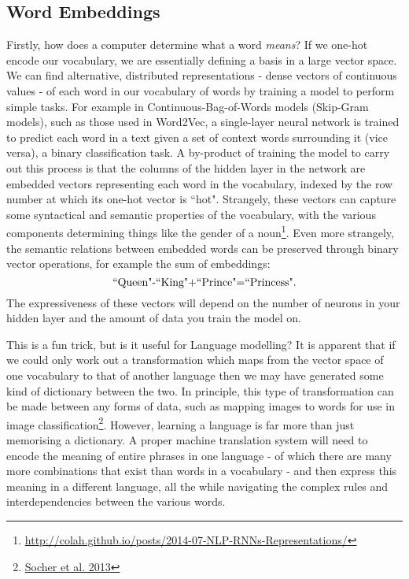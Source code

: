 \documentclass[]{article}
\begin{document}
\subsection{Word Embeddings}
Firstly, how does a computer determine what a word \textit{means}? If we one-hot encode our vocabulary, we are essentially defining a basis in a large vector space. We can find alternative, distributed representations - dense vectors of continuous values - of each word in our vocabulary of words by training a model to perform simple tasks. For example in Continuous-Bag-of-Words models (Skip-Gram models), such as those used in Word2Vec, a single-layer neural network is trained to predict each word in a text given a set of context words surrounding it (vice versa), a binary classification task.  A by-product of training the model to carry out this process is that the columns of the hidden layer in the network are embedded vectors representing each word in the vocabulary, indexed by the row number at which its one-hot vector is ``hot". Strangely, these vectors can capture some syntactical and semantic properties of the vocabulary, with the various components determining things like the gender of a noun\footnote{\url{http://colah.github.io/posts/2014-07-NLP-RNNs-Representations/}}. Even more strangely, the semantic relations between embedded words can be preserved through binary vector operations, for example the sum of embeddings: \begin{equation}\textnormal{``Queen"-``King"+``Prince"=``Princess".}
\end{equation}
The expressiveness of these vectors will depend on the number of neurons in your hidden layer and the amount of data you train the model on.

This is a fun trick, but is it useful for Language modelling? It is apparent that if we could only work out a transformation which maps from the vector space of one vocabulary to that of another language then we may have generated some kind of dictionary between the two. In principle, this type of transformation can be made between any forms of data, such as mapping images to words for use in image classification\footnote{\href{https://nlp.stanford.edu/~socherr/SocherGanjooManningNg_NIPS2013.pdf}{Socher et al. 2013}}. However, learning a language is far more than just memorising a dictionary. A proper machine translation system will need to encode the meaning of entire phrases in one language - of which there are many more combinations that exist than words in a vocabulary - and then express this meaning in a different language, all the while navigating the complex rules and interdependencies between the various words.
\end{document}
